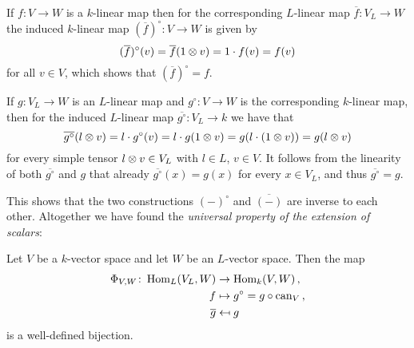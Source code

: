 \begin{fluff}
  If $f \colon V \to W$ is a $k$-linear map then for the corresponding $L$-linear map $\overline{f} \colon V_L \to W$ the induced $k$-linear map $(\overline{f})^\circ \colon V \to W$ is given by
  \[
      (\overline{f})^\circ(v)
    = \overline{f}(1 \mathbin{\otimes} v)
    = 1 \cdot f(v)
    = f(v)
  \]
  for all $v \in V$, which shows that $(\overline{f})^\circ = f$.
  
  If $g \colon V_L \to W$ is an $L$-linear map and $g^\circ \colon V \to W$ is the corresponding $k$-linear map, then for the induced $L$-linear map $\overline{g^\circ} \colon V_L \to k$ we have that
  \[
      \overline{g^\circ}(l \mathbin{\otimes} v)
    = l \cdot g^\circ(v)
    = l \cdot g(1 \mathbin{\otimes} v)
    = g(l \cdot (1 \mathbin{\otimes} v))
    = g(l \mathbin{\otimes} v)
  \]
  for every simple tensor $l \mathbin{\otimes} v \in V_L$ with $l \in L$, $v \in V$.
  It follows from the linearity of both $\overline{g^\circ}$ and $g$ that already $\overline{g^\circ}(x) = g(x)$ for every $x \in V_L$, and thus $\overline{g^\circ} = g$.
  
  This shows that the two constructions $(-)^\circ$ and $\overline{(-)}$ are inverse to each other.
  Altogether we have found the \emph{universal property of the extension of scalars}:
\end{fluff}


\begin{theorem}
  \label{theorem: universal property of extension of scalars}
  Let $V$ be a $k$-vector space and let $W$ be an $L$-vector space.
  Then the map
  \begin{align*}
                \Phi_{V,W}
    \colon      \operatorname{Hom}_L(V_L, W)
    &\to        \operatorname{Hom}_k(V,W) \,, \\
                f
    &\mapsto    g^\circ
     =          g \circ \operatorname{can}_V \,,  \\
                \overline{g}
    &\mapsfrom  g
  \end{align*}
  is a well-defined bijection.
\end{theorem}


